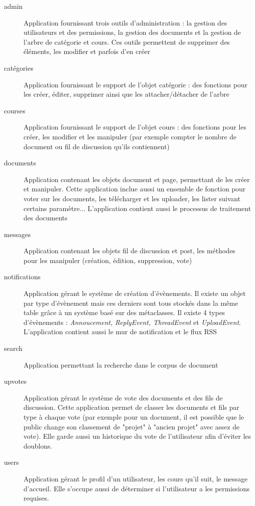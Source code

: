 \documentclass[a4paper,12pt]{article}
\begin{document}
\begin{description}
\item[admin] Application fournissant trois outils d'administration : la gestion
   des utilisateurs et des permissions, la gestion des documents et la gestion
   de l'arbre de catégorie et cours. Ces outils permettent de supprimer des éléments,
   les modifier et parfois d'en créer
\item[catégories] Application fournissant le support de l'objet catégorie :
   des fonctions pour les créer, éditer, supprimer ainsi que les attacher/détacher de l'arbre
\item[courses] Application fournissant le support de l'objet cours :
   des fonctions pour les créer, les modifier et les manipuler (par exemple compter le nombre
   de document ou fil de discussion qu'ils contiennent)
\item[documents] Application contenant les objets document et page, permettant de les
   créer et manipuler. Cette application inclue aussi un ensemble de fonction pour
   voter sur les documents, les télécharger et les uploader, les lister suivant certains
   paramètre... L'application contient aussi le processus de traitement des documents
\item[messages] Application contenant les objets fil de discussion et post, les méthodes
   pour les manipuler (création, édition, suppression, vote)
\item[notifications] Application gérant le système de création d'évènements. Il existe
   un objet par type d'évènement mais ces derniers sont tous stockés dans la même
   table grâce à un système basé sur des métaclasses. Il existe 4 types d'évènements :
   \textit{Annoucement, ReplyEvent, ThreadEvent} et \textit{UploadEvent}. L'application
   contient aussi le mur de notification et le flux RSS
\item[search] Application permettant la recherche dans le corpus de document
\item[upvotes] Application gérant le système de vote des documents et des fils de discussion.
   Cette application permet de classer les documents et fils par type à chaque vote
   (par exemple pour un document, il est possible que le public change son classement
   de "projet" à "ancien projet" avec assez de vote). Elle garde aussi un historique
   du vote de l'utilisateur afin d'éviter les doublons.
\item[users] Application gérant le profil d'un utilisateur, les cours qu'il suit, le
   message d'accueil. Elle s'occupe aussi de déterminer si l'utilisateur a les permissions requises.
\end{description}
\end{document}
